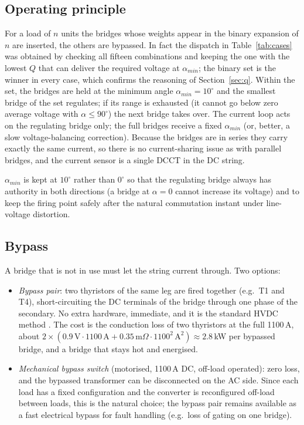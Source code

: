 \documentclass[11pt,a4paper]{article}
\begin{document}
\subsection{Operating principle}

For a load of $n$ units the bridges whose weights appear in the binary expansion of $n$ are inserted, the others are bypassed. In fact the dispatch in Table~\ref{tab:cases} was obtained by checking all fifteen combinations and keeping the one with the lowest $Q$ that can deliver the required voltage at $\alpha_{min}$; the binary set is the winner in every case, which confirms the reasoning of Section~\ref{sec:q}. Within the set, the bridges are held at the minimum angle $\alpha_{min} = 10^\circ$ and the smallest bridge of the set regulates; if its range is exhausted (it cannot go below zero average voltage with $\alpha \le 90^\circ$) the next bridge takes over. The current loop acts on the regulating bridge only; the full bridges receive a fixed $\alpha_{min}$ (or, better, a slow voltage-balancing correction). Because the bridges are in series they carry exactly the same current, so there is no current-sharing issue as with parallel bridges, and the current sensor is a single DCCT in the DC string.

$\alpha_{min}$ is kept at $10^\circ$ rather than $0^\circ$ so that the regulating bridge always has authority in both directions (a bridge at $\alpha = 0$ cannot increase its voltage) and to keep the firing point safely after the natural commutation instant under line-voltage distortion.

\subsection{Bypass}

A bridge that is not in use must let the string current through. Two options:

\begin{itemize}
\item \emph{Bypass pair}: two thyristors of the same leg are fired together (e.g.\ T1 and T4), short-circuiting the DC terminals of the bridge through one phase of the secondary. No extra hardware, immediate, and it is the standard HVDC method \cite{kimbark}. The cost is the conduction loss of two thyristors at the full 1100\,A, about $2\times(0.9\,\text{V}\cdot1100\,\text{A} + 0.35\,\text{m}\Omega\cdot1100^2\,\text{A}^2) \approx 2.8$\,kW per bypassed bridge, and a bridge that stays hot and energised.
\item \emph{Mechanical bypass switch} (motorised, 1100\,A DC, off-load operated): zero loss, and the bypassed transformer can be disconnected on the AC side. Since each load has a fixed configuration and the converter is reconfigured off-load between loads, this is the natural choice; the bypass pair remains available as a fast electrical bypass for fault handling (e.g.\ loss of gating on one bridge).
\end{itemize}
\end{document}
